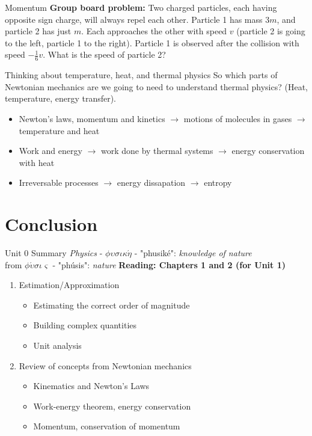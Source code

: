 \documentclass{beamer}
\begin{document}
\begin{frame}{Momentum}
\textbf{Group board problem:}
Two charged particles, each having opposite sign charge, will always repel each other.  Particle 1 has mass $3m$, and particle 2 has just $m$.  Each approaches the other with speed $v$ (particle 2 is going to the left, particle 1 to the right).  Particle 1 is observed after the collision with speed $-\frac{1}{6}v$.  What is the speed of particle 2?
\end{frame}

\begin{frame}{Thinking about temperature, heat, and thermal physics}
So which parts of Newtonian mechanics are we going to need to understand thermal physics? (Heat, temperature, energy transfer).
\begin{itemize}
\item Newton's laws, momentum and kinetics $\rightarrow$ motions of molecules in gases $\rightarrow$ temperature and heat
\item Work and energy $\rightarrow$ work done by thermal systems $\rightarrow$ energy conservation with heat
\item Irreversable processes $\rightarrow$ energy dissapation $\rightarrow$ entropy
\end{itemize}
\end{frame}

\section{Conclusion}

\begin{frame}{Unit 0 Summary}
\textit{Physics} - $\phi\upsilon\sigma\iota\kappa\acute{\eta}$ - "phusik\'e": \textit{knowledge of nature} \\
from $\phi\acute{\upsilon}\sigma\iota\varsigma$ - "ph\'usis": \textit{nature}
\textbf{Reading: Chapters 1 and 2 (for Unit 1)}
\begin{enumerate}
\item Estimation/Approximation
\begin{itemize}
\item \alert{Estimating} the correct order of magnitude
\item \alert{Building} complex quantities
\item \alert{Unit analysis}
\end{itemize}
\item Review of concepts from Newtonian mechanics
\begin{itemize}
\item Kinematics and \alert{Newton's Laws}
\item Work-energy theorem, energy conservation
\item Momentum, conservation of momentum
\end{itemize}
\end{enumerate}
\end{frame}
\end{document}

